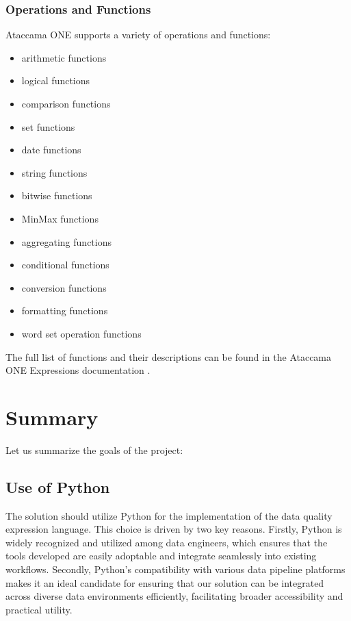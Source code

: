\subsubsection{Operations and Functions}

Ataccama ONE supports a variety of operations and functions:

\begin{itemize}
    \item arithmetic functions
    \item logical functions
    \item comparison functions
    \item set functions
    \item date functions
    \item string functions
    \item bitwise functions
    \item MinMax functions
    \item aggregating functions
    \item conditional functions
    \item conversion functions
    \item formatting functions
    \item word set operation functions
\end{itemize}

The full list of functions and their descriptions can be found in the Ataccama ONE Expressions documentation \cite{one_expressions}.

\section{Summary}

Let us summarize the goals of the project:

\subsection{Use of Python}

The solution should utilize Python for the implementation of the data quality expression language. This choice is driven by two key reasons. Firstly, Python is widely recognized and utilized among data engineers, which ensures that the tools developed are easily adoptable and integrate seamlessly into existing workflows. Secondly, Python's compatibility with various data pipeline platforms makes it an ideal candidate for ensuring that our solution can be integrated across diverse data environments efficiently, facilitating broader accessibility and practical utility.

